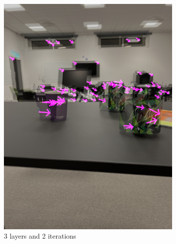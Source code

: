 \documentclass{article}
\begin{document}
\begin{figure}[H]
\begin{subfigure}{0.48\textwidth}
            \includegraphics[width=1\textwidth]{3levels-2iterations.png}
            \caption{3 layers and 2 iterations}
            \label{fig:sub:flow-no-pyr}
        \end{subfigure}
        \hspace{5px}
        \begin{subfigure}{0.48\textwidth}
            \centering

\end{subfigure}
\end{figure}
\end{document}
